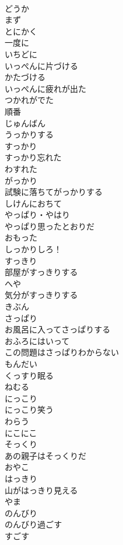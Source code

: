 \documentclass[8pt]{extreport}
\begin{document}
\begin{CJK}{UTF8}{min}
\\	どうか	
\\	まず	
\\	とにかく	
\\	一度に	
\\	いちどに
\\	いっぺんに片づける	
\\	かたづける
\\	いっぺんに疲れが出た	
\\	つかれがでた
\\	順番	
\\	じゅんばん
\\	うっかりする	
\\	すっかり	
\\	すっかり忘れた	
\\	わすれた
\\	がっかり	
\\	試験に落ちてがっかりする	
\\	しけんにおちて
\\	やっぱり・やはり	
\\	やっぱり思ったとおりだ	
\\	おもった
\\	しっかりしろ！	
\\	すっきり	
\\	部屋がすっきりする	
\\	へや
\\	気分がすっきりする	
\\	きぶん
\\	さっぱり	
\\	お風呂に入ってさっぱりする	
\\	おふろにはいって
\\	この問題はさっぱりわからない	
\\	もんだい
\\	くっすり眠る	
\\	ねむる
\\	にっこり	
\\	にっこり笑う	
\\	わらう
\\	にこにこ	
\\	そっくり	
\\	あの親子はそっくりだ	
\\	おやこ
\\	はっきり	
\\	山がはっきり見える	
\\	やま
\\	のんびり	
\\	のんびり過ごす	
\\	すごす

\end{CJK}
\end{document}
